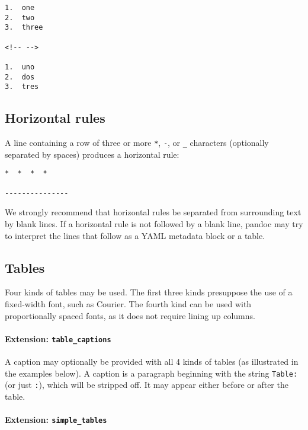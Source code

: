 \documentclass[
]{article}
\begin{document}
\begin{verbatim}
1.  one
2.  two
3.  three

<!-- -->

1.  uno
2.  dos
3.  tres
\end{verbatim}

\subsection{Horizontal rules}\label{horizontal-rules}

A line containing a row of three or more \texttt{*}, \texttt{-}, or
\texttt{\_} characters (optionally separated by spaces) produces a
horizontal rule:

\begin{verbatim}
*  *  *  *

---------------
\end{verbatim}

We strongly recommend that horizontal rules be separated from
surrounding text by blank lines. If a horizontal rule is not followed by
a blank line, pandoc may try to interpret the lines that follow as a
YAML metadata block or a table.

\subsection{Tables}\label{tables}

Four kinds of tables may be used. The first three kinds presuppose the
use of a fixed-width font, such as Courier. The fourth kind can be used
with proportionally spaced fonts, as it does not require lining up
columns.

\paragraph{\texorpdfstring{Extension:
\texttt{table\_captions}}{Extension: table\_captions}}\label{extension-table_captions}

A caption may optionally be provided with all 4 kinds of tables (as
illustrated in the examples below). A caption is a paragraph beginning
with the string \texttt{Table:} (or just \texttt{:}), which will be
stripped off. It may appear either before or after the table.

\paragraph{\texorpdfstring{Extension:
\texttt{simple\_tables}}{Extension: simple\_tables}}\label{extension-simple_tables}
\end{document}
